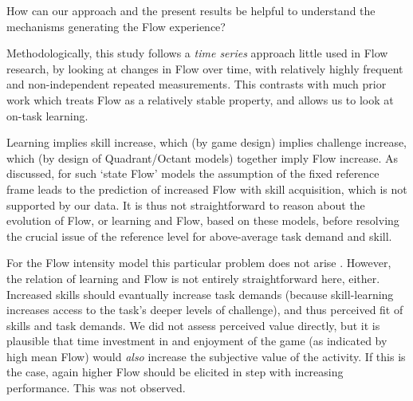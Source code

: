 \documentclass[a4paper,doc,floatsintext,natbib,10pt]{apa6}
\begin{document}
How can our approach and the present results be helpful to understand the mechanisms generating the Flow experience?

Methodologically, this study follows a {\it time series} approach little used in Flow research, by looking at changes in Flow over time, with relatively highly frequent and non-independent repeated measurements. This contrasts with much prior work which treats Flow as a relatively stable property, and allows us to look at on-task learning.

Learning implies skill increase, which (by game design) implies challenge increase, which (by design of Quadrant/Octant models) together imply Flow increase. As discussed, for such `state Flow' models the assumption of the fixed reference frame leads to the prediction of increased Flow with skill acquisition, which is not supported by our data. It is thus not straightforward to reason about the evolution of Flow, or learning and Flow, based on these models, before resolving the crucial issue of the reference level for above-average task demand and skill.

For the Flow intensity model this particular problem does not arise \citep{Keller2012}. However, the relation of learning and Flow is not entirely straightforward here, either. Increased skills should evantually increase task demands (because skill-learning increases access to the task's deeper levels of challenge), and thus perceived fit of skills and task demands. We did not assess perceived value directly, but it is plausible that time investment in and enjoyment of the game (as indicated by high mean Flow) would {\it also} increase the subjective value of the activity. If this is the case, again higher Flow should be elicited in step with increasing performance. This was not observed.





\end{document}
